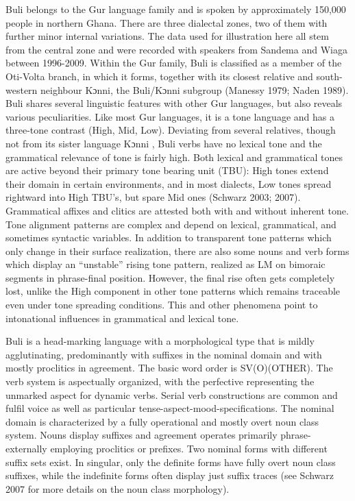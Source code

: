 \documentclass[output=paper]{langsci/langscibook}
\begin{document}
Buli belongs to the Gur language family and is spoken by approximately 150,000 people \citep{LewisEtAl2015} in northern Ghana. There are three dialectal zones, two of them with further minor internal variations. The data used for illustration here all stem from the central zone and were recorded with speakers from Sandema and Wiaga between 1996-2009. Within the Gur family, Buli is classified as a member of the Oti-Volta branch, in which it forms, together with its closest relative and south-western neighbour Kɔnni, the Buli/Kɔnni subgroup (Manessy 1979; Naden 1989). Buli shares several linguistic features with other Gur languages, but also reveals various peculiarities. Like most Gur languages, it is a tone language and has a three-tone contrast (High, Mid, Low). Deviating from several relatives, though not from its sister language Kɔnni \citep{Cahill2007}, Buli verbs have no lexical tone and the grammatical relevance of tone is fairly high. Both lexical and grammatical tones are active beyond their primary tone bearing unit (TBU): High tones extend their domain in certain environments, and in most dialects, Low tones spread rightward into High TBU’s, but spare Mid ones (Schwarz 2003; 2007). Grammatical affixes and clitics are attested both with and without inherent tone. Tone alignment patterns are complex and depend on lexical, grammatical, and sometimes syntactic variables. In addition to transparent tone patterns which only change in their surface realization, there are also some nouns and verb forms which display an “unstable” rising tone pattern, realized as LM on bimoraic segments in phrase-final position. However, the final rise often gets completely lost, unlike the High component in other tone patterns which remains traceable even under tone spreading conditions. This and other phenomena point to intonational influences in grammatical and lexical tone.

Buli is a head-marking language with a morphological type that is mildly agglutinating, predominantly with suffixes in the nominal domain and with mostly proclitics in agreement. The basic word order is SV(O)(OTHER). The verb system is aspectually organized, with the perfective representing the unmarked aspect for dynamic verbs. Serial verb constructions are common and fulfil voice as well as particular tense-aspect-mood-specifications. The nominal domain is characterized by a fully operational and mostly overt noun class system. Nouns display suffixes and agreement operates primarily phrase-externally employing proclitics or prefixes. Two nominal forms with different suffix sets exist. In singular, only the definite forms have fully overt noun class suffixes, while the indefinite forms often display just suffix traces (see Schwarz 2007 for more details on the noun class morphology).
\end{document}
